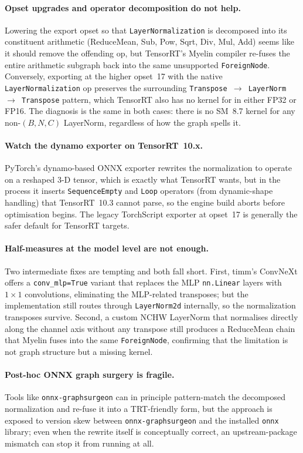\documentclass[runningheads,a4paper]{llncs}
\begin{document}
\paragraph{Opset upgrades and operator decomposition do not help.} Lowering the export opset so that \texttt{LayerNormalization} is decomposed into its constituent arithmetic (ReduceMean, Sub, Pow, Sqrt, Div, Mul, Add) seems like it should remove the offending op, but TensorRT's Myelin compiler re-fuses the entire arithmetic subgraph back into the same unsupported \texttt{ForeignNode}. Conversely, exporting at the higher opset~17 with the native \texttt{LayerNormalization} op preserves the surrounding \texttt{Transpose $\rightarrow$ LayerNorm $\rightarrow$ Transpose} pattern, which TensorRT also has no kernel for in either FP32 or FP16. The diagnosis is the same in both cases: there is no SM~8.7 kernel for any non-$(B,N,C)$ LayerNorm, regardless of how the graph spells it.

\paragraph{Watch the dynamo exporter on TensorRT~10.x.} PyTorch's dynamo-based ONNX exporter rewrites the normalization to operate on a reshaped 3-D tensor, which is exactly what TensorRT wants, but in the process it inserts \texttt{SequenceEmpty} and \texttt{Loop} operators (from dynamic-shape handling) that TensorRT~10.3 cannot parse, so the engine build aborts before optimisation begins. The legacy TorchScript exporter at opset~17 is generally the safer default for TensorRT targets.

\paragraph{Half-measures at the model level are not enough.} Two intermediate fixes are tempting and both fall short. First, timm's ConvNeXt offers a \texttt{conv\_mlp=True} variant that replaces the MLP \texttt{nn.Linear} layers with $1\!\times\!1$ convolutions, eliminating the MLP-related transposes; but the implementation still routes through \texttt{LayerNorm2d} internally, so the normalization transposes survive. Second, a custom NCHW LayerNorm that normalises directly along the channel axis without any transpose still produces a ReduceMean chain that Myelin fuses into the same \texttt{ForeignNode}, confirming that the limitation is not graph structure but a missing kernel.

\paragraph{Post-hoc ONNX graph surgery is fragile.} Tools like \texttt{onnx-graphsurgeon} can in principle pattern-match the decomposed normalization and re-fuse it into a TRT-friendly form, but the approach is exposed to version skew between \texttt{onnx-graphsurgeon} and the installed \texttt{onnx} library; even when the rewrite itself is conceptually correct, an upstream-package mismatch can stop it from running at all.
\end{document}
